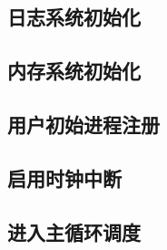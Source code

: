 \subsection{日志系统初始化}

\subsection{内存系统初始化}

\subsection{用户初始进程注册}

\subsection{启用时钟中断}

\subsection{进入主循环调度}